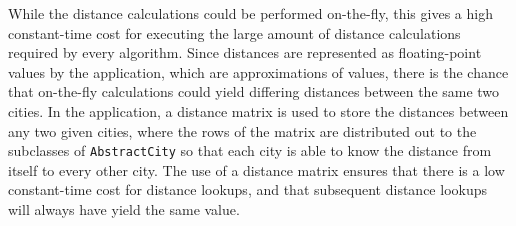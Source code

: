 \documentclass{l4proj}
\begin{document}
While the distance calculations could be performed on-the-fly, this gives a high constant-time cost for executing the large amount 
of distance calculations required by every algorithm. Since distances are represented as floating-point values by the application, 
which are approximations of values, there is the chance that on-the-fly calculations could yield differing distances between the same 
two cities. In the application, a distance matrix is used to store the distances between any two given cities, where the rows of the 
matrix are distributed out to the subclasses of \texttt{AbstractCity} so that each city is able to know the distance from itself to 
every other city. The use of a distance matrix ensures that there is a low constant-time cost for distance lookups, and that subsequent 
distance lookups will always have yield the same value.



\end{document}

